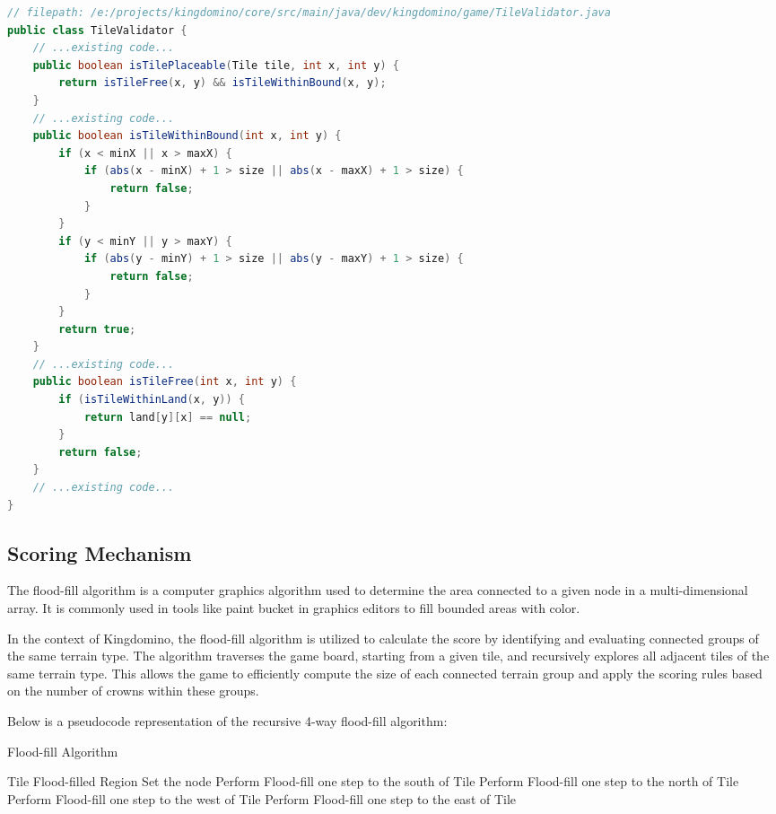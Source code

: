 \documentclass[conference]{IEEEtran}
\begin{document}
\begin{lstlisting}[language=Java]
// filepath: /e:/projects/kingdomino/core/src/main/java/dev/kingdomino/game/TileValidator.java
public class TileValidator {
    // ...existing code...
    public boolean isTilePlaceable(Tile tile, int x, int y) {
        return isTileFree(x, y) && isTileWithinBound(x, y);
    }
    // ...existing code...
    public boolean isTileWithinBound(int x, int y) {
        if (x < minX || x > maxX) {
            if (abs(x - minX) + 1 > size || abs(x - maxX) + 1 > size) {
                return false;
            }
        }
        if (y < minY || y > maxY) {
            if (abs(y - minY) + 1 > size || abs(y - maxY) + 1 > size) {
                return false;
            }
        }
        return true;
    }
    // ...existing code...
    public boolean isTileFree(int x, int y) {
        if (isTileWithinLand(x, y)) {
            return land[y][x] == null;
        }
        return false;
    }
    // ...existing code...
}
\end{lstlisting}

\subsection{Scoring Mechanism}

The flood-fill algorithm is a computer graphics algorithm used to determine the
area connected to a given node in a multi-dimensional array. It is commonly
used in tools like paint bucket in graphics editors to fill bounded areas with
color.

In the context of Kingdomino, the flood-fill algorithm is utilized to calculate
the score by identifying and evaluating connected groups of the same terrain
type. The algorithm traverses the game board, starting from a given tile, and
recursively explores all adjacent tiles of the same terrain type. This allows
the game to efficiently compute the size of each connected terrain group and
apply the scoring rules based on the number of crowns within these groups.

Below is a pseudocode representation of the recursive 4-way flood-fill
algorithm:

\begin{algorithm}[htbp]
    \caption{Flood-fill Algorithm}
    \begin{algorithmic}
        \Require Tile
        \Ensure Flood-filled Region
            \Return
        \EndIf
        \State Set the node
        \State Perform Flood-fill one step to the south of Tile
        \State Perform Flood-fill one step to the north of Tile
        \State Perform Flood-fill one step to the west of Tile
        \State Perform Flood-fill one step to the east of Tile\\
        \Return
    \end{algorithmic}
\end{algorithm}
\end{document}
